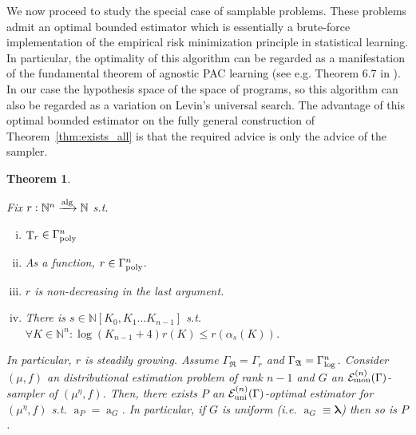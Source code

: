 \documentclass{article}
\numberwithin{equation}{section}
\theoremstyle{definition}
\theoremstyle{plain}
\newtheorem{theorem}{Theorem}[section]
\DeclareMathOperator{\T}{T}
\DeclareMathOperator{\A}{a}
\newcommand{\Nats}{\mathbb{N}}
\newcommand{\NatPoly}{\Nats[K_0, K_1 \ldots K_{n-1}]}
\newcommand{\Estr}{\bm{\lambda}}
\newcommand{\GrowR}{\Gamma_{\mathfrak{R}}}
\newcommand{\GrowA}{\Gamma_{\mathfrak{A}}}
\newcommand{\Fall}{\mathcal{E}}
\newcommand{\GammaPoly}{\Gamma_{\textnormal{poly}}}
\newcommand{\FallU}{{\Fall_{\textnormal{uni}}^{(n)}}}
\newcommand{\FallM}{\Fall_{\textnormal{mon}}^{(n)}}
\newcommand{\Alg}{\xrightarrow{\textnormal{alg}}}
\begin{document}
We now proceed to study the special case of samplable problems. These problems admit an optimal bounded estimator which is essentially a brute-force implementation of the empirical risk minimization principle in statistical learning. In particular, the optimality of this algorithm can be regarded as a manifestation of the fundamental theorem of agnostic PAC learning (see e.g. Theorem 6.7 in \cite{Shalev-Shwartz_2014}). In our case the hypothesis space of the space of programs, so this algorithm can also be regarded as a variation on Levin's universal search. The advantage of this optimal bounded estimator on the fully general construction of Theorem~\ref{thm:exists_all} is that the required advice is only the advice of the sampler.

\begin{samepage}
\begin{theorem}
\label{thm:exists_smp}

Fix ${r: \Nats^n \Alg \Nats}$ s.t.

\begin{enumerate}[(i)]

\item ${\T_r \in \GammaPoly^n}$

\item As a function, ${r \in \GammaPoly^n}$.

\item ${r}$ is non-decreasing in the last argument.

\item There is ${s \in \NatPoly}$ s.t. ${\forall K \in \Nats^n: \log(K_{n-1}+4)r(K) \leq r(\alpha_s(K))}$.

\end{enumerate}

In particular, ${r}$ is steadily growing. Assume ${\GrowR=\Gamma_r}$ and ${\GrowA=\Gamma_\textnormal{log}^n}$. Consider ${(\mu,f)}$ an distributional estimation problem of rank ${n-1}$ and ${G}$ an ${\FallM(\Gamma)}$-sampler of ${(\mu^\eta,f)}$. Then, there exists ${P}$ an ${\FallU(\Gamma)}$-optimal estimator for ${(\mu^\eta,f)}$ s.t. ${\A_P=\A_G}$. In particular, if ${G}$ is uniform (i.e. ${\A_G \equiv \Estr}$) then so is ${P}$.


\end{theorem}
\end{samepage}
\end{document}
